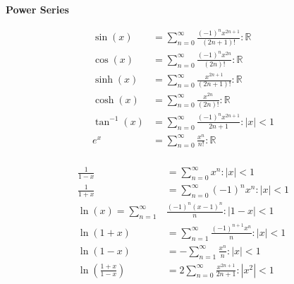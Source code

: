 \documentclass{article}
\begin{document}
\Large \begin{center}\textbf{Power Series}\end{center}
\begin{minipage}{0.5\textwidth}
\begin{align*}
\sin(x)&=\sum^\infty_{n=0}\frac{(-1)^{n}x^{2n+1}}{(2n+1)!}:\mathbb{R} \\[20pt]
\cos(x)&=\sum^\infty_{n=0}\frac{(-1)^{n}x^{2n}}{(2n)!}:\mathbb{R}\\[20pt]
\sinh(x)&=\sum^\infty_{n=0}\frac{x^{2n+1}}{(2n+1)!}:\mathbb{R}\\[20pt]
\cosh(x)&=\sum^\infty_{n=0}\frac{x^{2n}}{(2n)!}:\mathbb{R}\\[20pt]
\tan^{-1}(x)&=\sum^\infty_{n=0}\frac{(-1)^{n}x^{2n+1}}{2n+1}:|x|<1\\[20pt]
e^x&=\sum^\infty_{n=0}\frac{x^n}{n!}:\mathbb{R}\\[20pt]
\end{align*}
\end{minipage}
\hfill
\begin{minipage}{0.5\textwidth}
\begin{align*}
\frac{1}{1-x}&=\sum^\infty_{n=0}x^n:|x|<1\\[20pt]
\frac{1}{1+x}&=\sum^\infty_{n=0}(-1)^{n}x^n:|x|<1\\[20pt]
\ln(x)=\sum^\infty_{n=1}&\frac{(-1)^{n}(x-1)^n}{n}:|1-x|<1\\[20pt]
\ln(1+x)&=\sum^\infty_{n=1}\frac{(-1)^{n+1}x^n}{n}:|x|<1\\[20pt]
\ln(1-x)&=-\sum^\infty_{n=1}\frac{x^n}{n}:|x|<1\\[20pt]
\ln(\frac{1+x}{1-x})&=2\sum^\infty_{n=0}\frac{x^{2n+1}}{2n+1}:|x^2|<1\\[20pt]
\end{align*}
\end{minipage}
\end{document}
